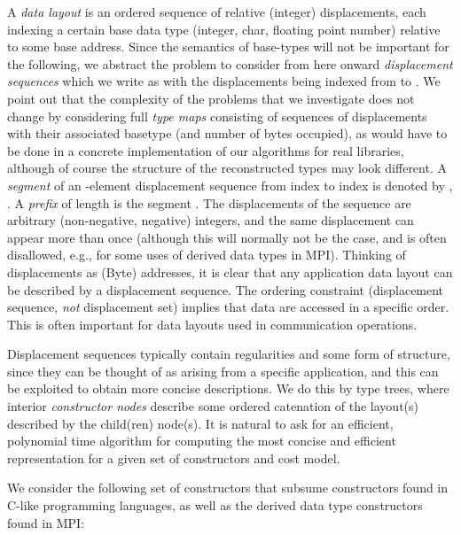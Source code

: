 \documentclass[a4paper,11pt]{article}
\begin{document}
A \emph{data layout} is an ordered sequence of relative (integer)
displacements, each indexing a certain base data type (integer, char,
floating point number) relative to some base address. Since the
semantics of base-types will not be important for the following, we
abstract the problem to consider from here onward \emph{displacement
  sequences} which we write as  with
the displacements  being indexed from  to . We point
out that the complexity of the problems that we investigate does not
change by considering full \emph{type maps} consisting of sequences of
displacements with their associated basetype (and number of bytes
occupied), as would have to be done in a concrete implementation of
our algorithms for real libraries, although of course the structure of
the reconstructed types may look different.  A \emph{segment} of an
-element displacement sequence from index  to index  is
denoted by , .  A \emph{prefix} of length  is the segment . The
displacements of the sequence are arbitrary (non-negative, negative)
integers, and the same displacement can appear more than once
(although this will normally not be the case, and is often disallowed,
e.g., for some uses of derived data types in MPI). Thinking of
displacements as (Byte) addresses, it is clear that any application
data layout can be described by a displacement sequence. The ordering
constraint (displacement sequence, \emph{not} displacement set)
implies that data are accessed in a specific order.  This is often
important for data layouts used in communication operations.

Displacement sequences typically contain regularities and some form of
structure, since they can be thought of as arising from a specific
application, and this can be exploited to obtain more concise
descriptions.  We do this by type trees, where interior
\emph{constructor nodes} describe some ordered catenation of the
layout(s) described by the child(ren) node(s).  It is natural to ask
for an efficient, polynomial time algorithm for computing the most
concise and efficient representation for a given set of constructors
and cost model.

We consider the following set of constructors that subsume
constructors found in C-like programming languages, as well as the
derived data type constructors found in MPI:
\end{document}

